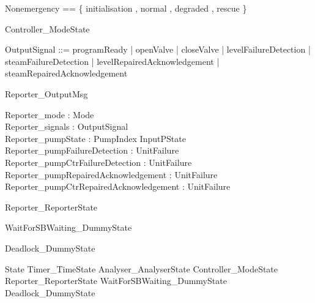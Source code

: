 \documentclass{article}
\begin{document}
\begin{zed}
	Nonemergency == \{ initialisation , normal , degraded , rescue \}
\end{zed}

\begin{zed}
	Controller\_ModeState 
\end{zed}

\begin{zed}
	OutputSignal ::= programReady | openValve | closeValve | levelFailureDetection | steamFailureDetection | levelRepairedAcknowledgement | steamRepairedAcknowledgement
\end{zed}

\begin{schema}{Reporter\_OutputMsg}

 Reporter\_mode : Mode \\
 Reporter\_signals : \power OutputSignal \\
 Reporter\_pumpState : PumpIndex \fun InputPState \\
 Reporter\_pumpFailureDetection : \power UnitFailure \\
 Reporter\_pumpCtrFailureDetection : \power UnitFailure \\
 Reporter\_pumpRepairedAcknowledgement : \power UnitFailure \\
 Reporter\_pumpCtrRepairedAcknowledgement : \power UnitFailure
\end{schema}

\begin{zed}
	Reporter\_ReporterState 
\end{zed}

\begin{zed}
	WaitForSBWaiting\_DummyState 
\end{zed}

\begin{zed}
	Deadlock\_DummyState 
\end{zed}

\begin{zed}
	State  Timer\_TimeState \land Analyser\_AnalyserState \land Controller\_ModeState \land Reporter\_ReporterState \land WaitForSBWaiting\_DummyState \land Deadlock\_DummyState
\end{zed}
\end{document}

